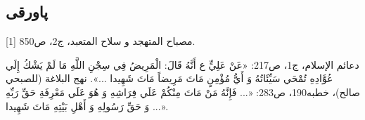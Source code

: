\subsection{پاورقی}

[1] مصباح المتهجد و سلاح المتعبد، ج‏2، ص850.

\noindent
[2] دعائم الإسلام، ج1، ص217: «عَنْ عَلِيٍّ ع أَنَّهُ قَالَ: الْمَرِيضُ فِي سِجْنِ اللَّهِ مَا لَمْ يَشْكُ إِلَي عُوَّادِهِ تُمْحَي سَيِّئَاتُهُ وَ أَيُّ مُؤْمِنٍ مَاتَ مَرِيضاً مَاتَ‏ شَهِيدا ...». نهج البلاغة (للصبحي صالح)، خطبه190، ص283: «... فَإِنَّهُ مَنْ مَاتَ مِنْكُمْ عَلَي فِرَاشِهِ وَ هُوَ عَلَي مَعْرِفَةِ حَقِّ رَبِّهِ وَ حَقِّ رَسُولِهِ وَ أَهْلِ بَيْتِهِ مَاتَ‏ شَهِيدا ...».

